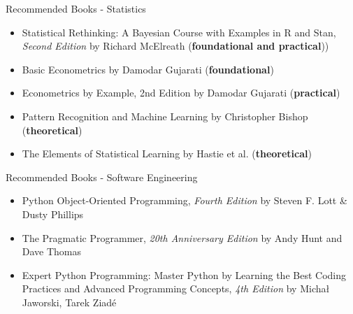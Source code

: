 \documentclass[compress,brown]{beamer}
\begin{document}
\begin{frame}{Recommended Books - Statistics}
	\begin{itemize}
		\item Statistical Rethinking: A Bayesian Course with Examples in R and Stan, \textit{Second Edition} by Richard McElreath (\textbf{foundational and practical}))
		\item Basic Econometrics by Damodar Gujarati (\textbf{foundational})
		\item Econometrics by Example, 2nd Edition by Damodar Gujarati (\textbf{practical})
		\item Pattern Recognition and Machine Learning by Christopher Bishop (\textbf{theoretical})
		\item The Elements of Statistical Learning by Hastie et al. (\textbf{theoretical})
	\end{itemize}
\end{frame}

\begin{frame}{Recommended Books - Software Engineering}
	\begin{itemize}
		\item Python Object-Oriented Programming, \textit{Fourth Edition} by Steven F. Lott \& Dusty Phillips
		\item The Pragmatic Programmer, \textit{20th Anniversary Edition} by Andy Hunt and Dave Thomas
		\item Expert Python Programming: Master Python by Learning the Best Coding Practices and Advanced Programming Concepts, \textit{4th Edition} by Michał Jaworski, Tarek Ziadé
	\end{itemize}
\end{frame}
\end{document}
